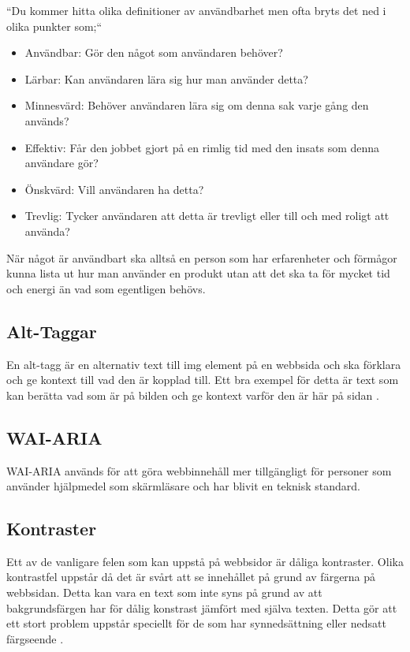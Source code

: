 \documentclass[11p]{article}
\begin{document}
    ``Du kommer hitta olika definitioner av användbarhet men ofta bryts det ned i olika punkter som;``

    \begin{itemize}
        \item Användbar: Gör den något som användaren behöver?
        \item Lärbar: Kan användaren lära sig hur man använder detta?
        \item Minnesvärd: Behöver användaren lära sig om denna sak varje gång den används?
        \item Effektiv: Får den jobbet gjort på en rimlig tid med den insats som denna användare gör?
        \item Önskvärd: Vill användaren ha detta?
        \item Trevlig: Tycker användaren att detta är trevligt eller till och med roligt att använda?
    \end{itemize}

    När något är användbart ska alltså en person som har erfarenheter och förmågor kunna lista ut hur man använder en produkt utan att det ska ta för mycket tid och energi än vad som egentligen behövs.

    \subsection{Alt-Taggar}
    En alt-tagg är en alternativ text till img element på en webbsida och ska förklara och ge kontext till vad den är kopplad till.
    Ett bra exempel för detta är text som kan berätta vad som är på bilden och ge kontext varför den är här på sidan \textcite{Nordström}.

    \subsection{WAI-ARIA}
    WAI-ARIA används för att göra webbinnehåll mer tillgängligt för personer som använder hjälpmedel som skärmläsare och har blivit en teknisk standard. \textcite{ARIA}


    \subsection{Kontraster}
    Ett av de vanligare felen som kan uppstå på webbsidor är dåliga kontraster.
    Olika kontrastfel uppstår då det är svårt att se innehållet på grund av färgerna på webbsidan.
    Detta kan vara en text som inte syns på grund av att bakgrundsfärgen har för dålig konstrast jämfört med själva texten.
    Detta gör att ett stort problem uppstår speciellt för de som har synnedsättning eller nedsatt färgseende \textcite{Digg_2021}.
\end{document}
